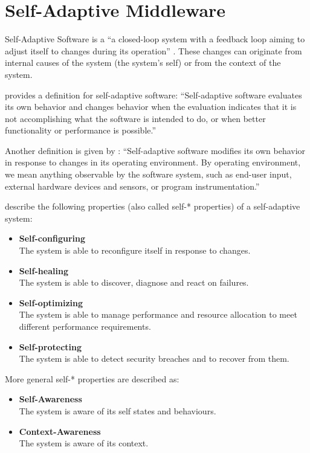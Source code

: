 \section{Self-Adaptive Middleware}
Self-Adaptive Software is a ``a closed-loop system with a feedback loop aiming to adjust itself to changes during its operation'' \citep{Salehie:2009pi}. These changes can originate from internal causes of the system (the system's self) or from the context of the system.

\citet{Laddaga:2008ff} provides a definition for self-adaptive software: ``Self-adaptive software evaluates its own behavior and changes behavior when the evaluation indicates that it is not accomplishing what the software is intended to do, or when better functionality or performance is possible.'' 

Another definition is given by \citet{Oreizy:1999lh}: ``Self-adaptive software modifies its own behavior in response to changes in its operating environment. By operating environment, we mean anything observable by the software system, such as end-user input, external hardware devices and sensors, or program instrumentation.''

\cite{Salehie:2009pi} describe the following properties (also called self-* properties) of a self-adaptive system:
\begin{itemize}
	\item \textbf{Self-configuring}\\
	The system is able to reconfigure itself in response to changes.
	\item \textbf{Self-healing}\\
	The system is able to discover, diagnose and react on failures.
	\item \textbf{Self-optimizing}\\
	The system is able to manage performance and resource allocation to meet different performance requirements.
	\item \textbf{Self-protecting}\\
	The system is able to detect security breaches and to recover from them.
\end{itemize}

More general self-* properties are described as:
\begin{itemize}
	\item \textbf{Self-Awareness}\\
	The system is aware of its self states and behaviours.
	\item \textbf{Context-Awareness}\\
	The system is aware of its context.
\end{itemize}

